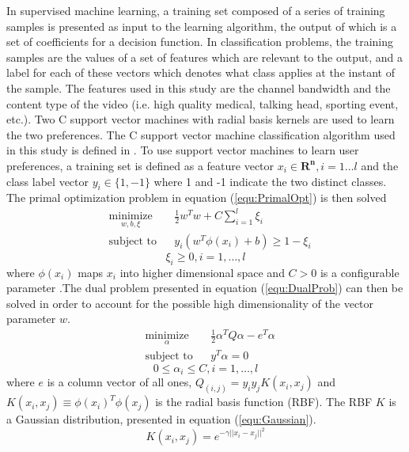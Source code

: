 \documentclass[3p,times,procedia]{elsarticle}
\begin{document}
In supervised machine learning, a training set composed of a series of training samples is presented as input to the learning algorithm, the output of which is a set of coefficients for a decision function. In classification problems, the training samples are the values of a set of features which are relevant to the output, and a label for each of these vectors which denotes what class applies at the instant of the sample. The features used in this study are the channel bandwidth and the content type of the video (i.e. high quality medical, talking head, sporting event, etc.). Two C support vector machines with radial basis kernels are used to learn the two preferences. The C support vector machine classification algorithm used in this study is defined in \cite{LibSVM}. To use support vector machines to learn user preferences, a training set is defined as a feature vector $x_i \in \mathbf{R^n}  ,i=1\ldots{l}$ and the class label vector $y_i \in \lbrace 1,-1 \rbrace $ where 1 and -1 indicate the two distinct classes. The primal optimization problem in equation (\ref{equ:PrimalOpt}) is then solved \cite{LibSVM}
\begin{equation}
\begin{aligned}
\label{equ:PrimalOpt}
& \underset{w,b,\xi}{\text{minimize}}
& & \frac{1}{2}w^Tw+C\sum_{i=1}^{l} \xi_i \\
& \text{subject to}
& &  y_i(w^T\phi(x_i) + b) \ge 1 - \xi_i
\end{aligned}
\end{equation}
\[ \xi_i \ge 0, i = 1,\ldots ,l \]
where $\phi (x_i)$ maps $x_i$ into higher dimensional space and $C > 0$ is a configurable parameter \cite{LibSVM}.The dual problem presented in equation (\ref{equ:DualProb}) can then be solved in order to account for the possible high dimensionality of the vector parameter $w$.
\begin{equation}
\begin{aligned}
\label{equ:DualProb}
& \underset{\alpha}{\text{minimize}}
& & \frac{1}{2}\alpha^TQ\alpha-e^T\alpha \\
& \text{subject to}
& &  y^T\alpha = 0
\end{aligned}
\end{equation}
\[ 0 \le \alpha_i \le C, i = 1,\ldots ,l \]
where $e$ is a column vector of all ones, $Q_(i,j)=y_i y_j K(x_i,x_j)$ and $K(x_i,x_j ) \equiv \phi (x_i )^T \phi (x_j)$ is the radial basis function (RBF). The RBF $K$ is a Gaussian distribution, presented in equation (\ref{equ:Gaussian}).
\begin{equation}
\label{equ:Gaussian}
K(x_i, x_j) = e^{-\gamma ||x_i - x_j||^{2}}
\end{equation}
\end{document}
